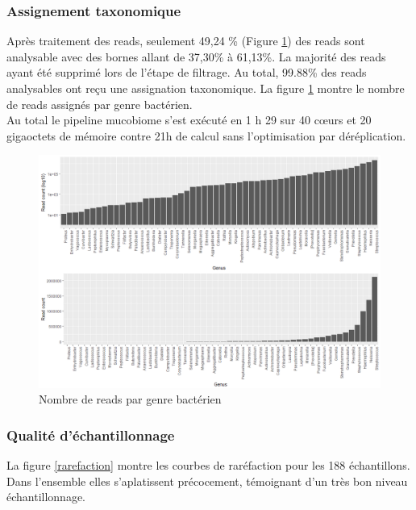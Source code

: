 \documentclass[12pt,a4paper]{article}
\begin{document}
\subsubsection{Assignement taxonomique}
Après traitement des reads, seulement 49,24 \% (Figure \ref{readgenus}) des reads sont analysable avec des bornes allant de 37,30\% à 61,13\%. La majorité des reads ayant été supprimé lors de l'étape de filtrage.
Au total, 99.88\% des reads analysables ont reçu une assignation taxonomique. La figure \ref{readgenus} montre le nombre de reads assignés par genre bactérien. \\
Au total le pipeline mucobiome s’est exécuté en 1 h 29 sur 40 cœurs et 20 gigaoctets de mémoire contre 21h de calcul sans l’optimisation par déréplication.


\begin{figure}[ht]
\begin{center}
\includegraphics[scale=0.5]{img/read_count_genus_all.png}\hfill
\end{center}
\caption{Nombre de reads par genre bactérien}
\label{readgenus}
\end{figure}


\subsubsection{Qualité d'échantillonnage}
La figure \ref{rarefaction} montre les courbes de raréfaction pour les 188 échantillons.
Dans l'ensemble elles s’aplatissent précocement, témoignant d’un très bon niveau échantillonnage.
\end{document}
